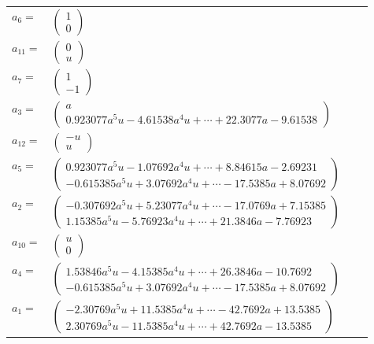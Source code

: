 \documentclass[1p]{elsarticle_modified}
\theoremstyle{definition}
\begin{document}
\begin{tabular}{m{7pt} m{180pt} m{7pt} m{180pt} }
\flushright $a_{6}=$&$\begin{pmatrix}1\\0\end{pmatrix}$ \\
\flushright $a_{11}=$&$\begin{pmatrix}0\\u\end{pmatrix}$ \\
\flushright $a_{7}=$&$\begin{pmatrix}1\\-1\end{pmatrix}$ \\
\flushright $a_{3}=$&$\begin{pmatrix}a\\0.923077 a^{5} u-4.61538 a^{4} u+\cdots+22.3077 a-9.61538\end{pmatrix}$ \\
\flushright $a_{12}=$&$\begin{pmatrix}- u\\u\end{pmatrix}$ \\
\flushright $a_{5}=$&$\begin{pmatrix}0.923077 a^{5} u-1.07692 a^{4} u+\cdots+8.84615 a-2.69231\\-0.615385 a^{5} u+3.07692 a^{4} u+\cdots-17.5385 a+8.07692\end{pmatrix}$ \\
\flushright $a_{2}=$&$\begin{pmatrix}-0.307692 a^{5} u+5.23077 a^{4} u+\cdots-17.0769 a+7.15385\\1.15385 a^{5} u-5.76923 a^{4} u+\cdots+21.3846 a-7.76923\end{pmatrix}$ \\
\flushright $a_{10}=$&$\begin{pmatrix}u\\0\end{pmatrix}$ \\
\flushright $a_{4}=$&$\begin{pmatrix}1.53846 a^{5} u-4.15385 a^{4} u+\cdots+26.3846 a-10.7692\\-0.615385 a^{5} u+3.07692 a^{4} u+\cdots-17.5385 a+8.07692\end{pmatrix}$ \\
\flushright $a_{1}=$&$\begin{pmatrix}-2.30769 a^{5} u+11.5385 a^{4} u+\cdots-42.7692 a+13.5385\\2.30769 a^{5} u-11.5385 a^{4} u+\cdots+42.7692 a-13.5385\end{pmatrix}$ \\

\end{tabular}
\end{document}
